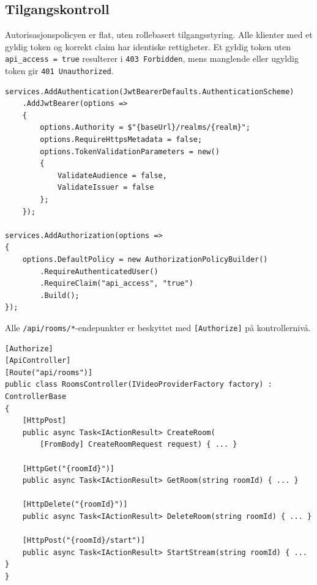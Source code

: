 \subsection{Tilgangskontroll}

Autorisasjonspolicyen er flat, uten rollebasert tilgangsstyring. Alle klienter med et gyldig token og korrekt claim har identiske rettigheter. Et gyldig token uten \texttt{api\_access = true} resulterer i \texttt{403 Forbidden}, mens manglende eller ugyldig token gir \texttt{401 Unauthorized}.

\begin{lstlisting}[language={[Sharp]C}, caption={KeycloakExtensions.cs – JWT-validering og autorisasjonspolicy}]
services.AddAuthentication(JwtBearerDefaults.AuthenticationScheme)
    .AddJwtBearer(options =>
    {
        options.Authority = $"{baseUrl}/realms/{realm}";
        options.RequireHttpsMetadata = false;
        options.TokenValidationParameters = new()
        {
            ValidateAudience = false,
            ValidateIssuer = false
        };
    });

services.AddAuthorization(options =>
{
    options.DefaultPolicy = new AuthorizationPolicyBuilder()
        .RequireAuthenticatedUser()
        .RequireClaim("api_access", "true")
        .Build();
});
\end{lstlisting}

Alle \texttt{/api/rooms/*}-endepunkter er beskyttet med
\texttt{[Authorize]} på kontrollernivå.

\begin{lstlisting}[language={[Sharp]C}, caption={RoomsController.cs – beskyttede endepunkter}]
[Authorize]
[ApiController]
[Route("api/rooms")]
public class RoomsController(IVideoProviderFactory factory) : ControllerBase
{
    [HttpPost]
    public async Task<IActionResult> CreateRoom(
        [FromBody] CreateRoomRequest request) { ... }

    [HttpGet("{roomId}")]
    public async Task<IActionResult> GetRoom(string roomId) { ... }

    [HttpDelete("{roomId}")]
    public async Task<IActionResult> DeleteRoom(string roomId) { ... }

    [HttpPost("{roomId}/start")]
    public async Task<IActionResult> StartStream(string roomId) { ... }
}
\end{lstlisting}

